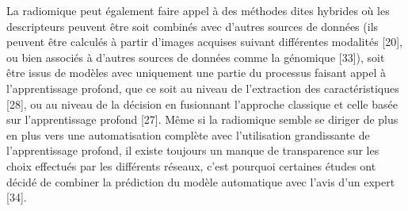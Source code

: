 \documentclass[]{memoir}
\begin{document}
La radiomique peut également faire appel à des méthodes dites hybrides où les descripteurs peuvent être soit combinés avec d’autres sources de données (ils peuvent être calculés à partir d’images acquises suivant différentes modalités [20], ou bien associés à d’autres sources de données comme la génomique [33]), soit être issus de modèles avec uniquement une partie du processus faisant appel à l’apprentissage profond, que ce soit au niveau de l’extraction des caractéristiques [28], ou au niveau de la décision en fusionnant l’approche classique et celle basée sur l’apprentissage profond [27].
Même si la radiomique semble se diriger de plus en plus vers une automatisation complète avec l’utilisation grandissante de l’apprentissage profond, il existe toujours un manque de transparence sur les choix effectués par les différents réseaux, c’est pourquoi certaines études ont décidé de combiner la prédiction du modèle automatique avec l’avis d’un expert [34].
\end{document}
